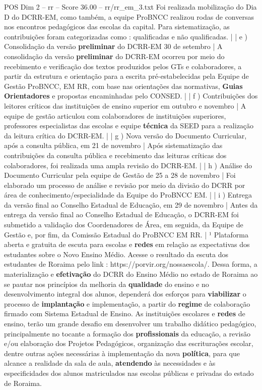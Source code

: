 \begin{textsample}{POS Dim 2 – rr – Score 36.00 – rr/rr\_em\_3.txt}
Foi realizada mobilização do Dia D do DCRR-EM, como também, a equipe ProBNCC realizou rodas de conversas nos encontros pedagógicos das escolas da capital.
Para sistematização, as contribuições foram categorizadas como : qualificadas e não qualificadas. | | e ) Consolidação da versão \textbf{preliminar} do DCRR-EM 30 de setembro | A consolidação da versão \textbf{preliminar} do DCRR-EM ocorreu por meio do recebimento e verificação dos textos produzidos pelos GTs e colaboradores, a partir da estrutura e orientação para a escrita pré-estabelecidas pela Equipe de Gestão ProBNCC, EM RR, com base nas orientações das normativas, \textbf{Guias} \textbf{Orientadores} e propostas encaminhadas pelo CONSED. | | f ) Contribuições dos leitores críticos das instituições de ensino superior em outubro e novembro | A equipe de gestão articulou com colaboradores de instituições superiores, professores especialistas das escolas e equipe \textbf{técnica} da SEED para a realização da leitura crítica do DCRR-EM. | | g ) Nova versão do Documento Curricular, após a consulta pública, em 21 de novembro | Após sistematização das contribuições da consulta pública e recebimento das leituras críticas dos colaboradores, foi realizada uma ampla revisão do DCRR-EM. | | h ) Análise do Documento Curricular pela equipe de Gestão de 25 a 28 de novembro | Foi elaborado um processo de análise e revisão por meio da divisão do DCRR por área de conhecimento/especialidade da Equipe do ProBNCC EM. | | i ) Entrega da versão final ao Conselho Estadual de Educação, em 29 de novembro | Antes da entrega da versão final ao Conselho Estadual de Educação, o DCRR-EM foi submetido a validação dos Coordenadores de Área, em seguida, da Equipe de Gestão e, por fim, da Comissão Estadual do ProBNCC EM RR. | ¹ Plataforma aberta e gratuita de escuta para escolas e \textbf{redes} em relação as expectativas dos estudantes sobre o Novo Ensino Médio.
Acesse o resultado da escuta dos estudantes de Roraima pelo link : https://porvir.org/nossaescola/.
Dessa forma, a materialização e \textbf{efetivação} do DCRR do Ensino Médio no estado de Roraima ao se pautar nos princípios da melhoria da \textbf{qualidade} do ensino e no desenvolvimento integral dos alunos, dependerá dos esforços para \textbf{viabilizar} o processo de \textbf{implantação} e implementação, a partir do \textbf{regime} de colaboração firmado com Sistema Estadual de Ensino.
As instituições escolares e \textbf{redes} de ensino, terão um grande desafio em desenvolver um trabalho didático pedagógico, principalmente no tocante a formação dos \textbf{profissionais} da educação, a revisão e/ou elaboração dos Projetos Pedagógicos, organização das escriturações escolar, dentre outras ações necessárias à implementação da nova \textbf{política}, para que alcance a realidade da sala de aula, \textbf{atendendo} às necessidades e às especificidades dos alunos matriculados nas escolas públicas e privadas do estado de Roraima.


\end{textsample}
